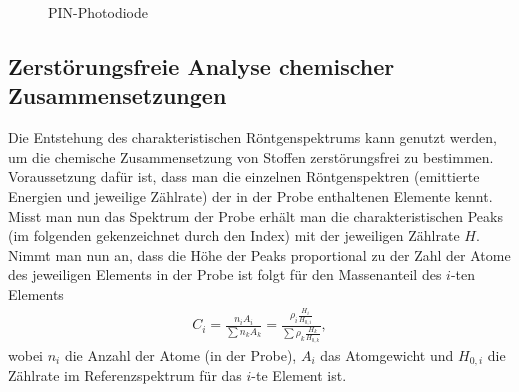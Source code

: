 \begin{figure}[h]
  \centering
  \caption{PIN-Photodiode}
  \label{fig:pin}
\end{figure}

\subsection{Zerstörungsfreie Analyse chemischer Zusammensetzungen}
Die Entstehung des charakteristischen Röntgenspektrums kann genutzt werden, um die chemische Zusammensetzung von Stoffen zerstörungsfrei zu bestimmen. Voraussetzung dafür ist, dass man die einzelnen Röntgenspektren (emittierte Energien und jeweilige Zählrate) der in der Probe enthaltenen Elemente kennt. Misst man nun das Spektrum der Probe erhält man die charakteristischen Peaks (im folgenden gekenzeichnet durch den Index) mit der jeweiligen Zählrate $H$. Nimmt man nun an, dass die Höhe der Peaks proportional zu der Zahl der Atome des jeweiligen Elements in der Probe ist folgt für den Massenanteil des $i$-ten Elements
\begin{align}
  C_i=\frac{n_iA_i}{\sum n_k A_k}=\frac{\rho_i \frac{H_i}{H_{0,i}}}{\sum \rho_k \frac{H_k}{H_{0,k}}},
\end{align}  
wobei $n_i$ die Anzahl der Atome (in der Probe), $A_i$ das Atomgewicht und $H_{0,i}$ die Zählrate im Referenzspektrum für das $i$-te Element ist. 

